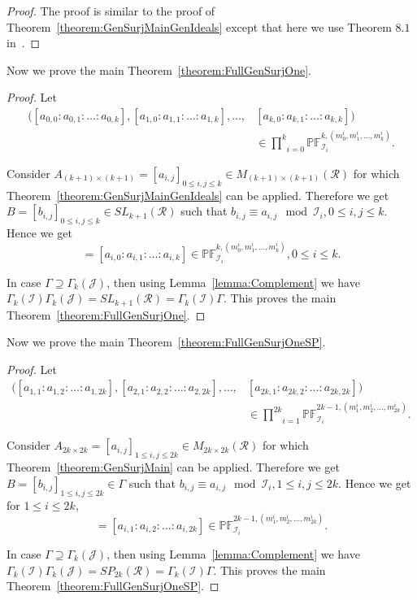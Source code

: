 \documentclass[12pt]{amsart}
\newcommand{\mbb}{\mathbb}
\newcommand{\mcl}{\mathcal}
\newcommand{\us}{\underset}
\newcommand{\os}{\overset}
\newcommand{\I}{\mcl I}
\newcommand{\R}{\mcl R}
\newcommand{\equ}[1]{%
\begin{equation*}
#1
\end{equation*}
}
\newcommand{\equa}[1]{%
\begin{equation*}
\begin{aligned}
#1
\end{aligned}
\end{equation*}
}
\theoremstyle{plain}
\theoremstyle{definition}
\theoremstyle{remark}
\numberwithin{equation}{section}
\begin{document}
\begin{proof}
The proof is similar to the proof of Theorem~\ref{theorem:GenSurjMainGenIdeals} except that here we use Theorem $8.1$ in~\cite{CPAKII}.	
\end{proof}
Now we prove the main Theorem~\ref{theorem:FullGenSurjOne}.
\begin{proof}
Let \equa{\big([a_{0,0}:a_{0,1}:\ldots: a_{0,k}],[a_{1,0}:a_{1,1}:\ldots: a_{1,k}],\ldots,&[a_{k,0}:a_{k,1}:\ldots: a_{k,k}]\big)\\&\in \us{i=0}{\os{k}{\prod}}\mbb{PF}^{k,(m^i_0,m^i_1,\ldots,m^i_k)}_{\I_i}.}
Consider $A_{(k+1)\times (k+1)}=[a_{i,j}]_{0\leq i,j\leq k}\in M_{(k+1)\times (k+1)}(\R)$ for which Theorem~\ref{theorem:GenSurjMainGenIdeals} can be applied. Therefore we get 
$B=[b_{i,j}]_{0\leq i,j\leq k} \in SL_{k+1}(\R)$ such that $b_{i,j}\equiv a_{i,j} \mod \mcl{I}_i,0\leq i,j\leq k$. Hence we get 
\equ{[b_{i,0}:b_{i,1}:\ldots: b_{i,k}]=[a_{i,0}:a_{i,1}:\ldots: a_{i,k}]\in \mbb{PF}^{k,(m^i_0,m^i_1,\ldots,m^i_k)}_{\I_i},0\leq i\leq k.}
In case $\Gamma \supseteq \Gamma_k(\mcl{J})$, then using Lemma~\ref{lemma:Complement} we have $\Gamma_k(\I)\Gamma_k(\mcl{J})=SL_{k+1}(\R)=\Gamma_k(\I)\Gamma$.
This proves the main Theorem~\ref{theorem:FullGenSurjOne}.	
\end{proof}
Now we prove the main Theorem~\ref{theorem:FullGenSurjOneSP}.
\begin{proof}
	Let \equa{\big([a_{1,1}:a_{1,2}:\ldots: a_{1,2k}],[a_{2,1}:a_{2,2}:\ldots: a_{2,2k}],\ldots,&[a_{2k,1}:a_{2k,2}:\ldots: a_{2k,2k}]\big)\\&\in \us{i=1}{\os{2k}{\prod}}\mbb{PF}^{2k-1,(m^i_1,m^i_2,\ldots,m^i_{2k})}_{\I_i}.}
	Consider $A_{2k\times 2k}=[a_{i,j}]_{1\leq i,j\leq 2k}\in M_{2k\times 2k}(\R)$ for which Theorem~\ref{theorem:GenSurjMain} can be applied. Therefore we get 
	$B=[b_{i,j}]_{1\leq i,j\leq 2k} \in \Gamma$ such that $b_{i,j}\equiv a_{i,j} \mod \mcl{I}_i,1\leq i,j\leq 2k$. Hence we get for $1\leq i\leq 2k$,
	\equ{[b_{i,1}:b_{i,2}:\ldots: b_{i,2k}]=[a_{i,1}:a_{i,2}:\ldots: a_{i,2k}]\in \mbb{PF}^{2k-1,(m^i_1,m^i_2,\ldots,m^i_{2k})}_{\I_i}.}
In case $\Gamma \supseteq \Gamma_k(\mcl{J})$, then using Lemma~\ref{lemma:Complement} we have $\Gamma_k(\I)\Gamma_k(\mcl{J})=SP_{2k}(\R)=\Gamma_k(\I)\Gamma$.
	This proves the main Theorem~\ref{theorem:FullGenSurjOneSP}.
\end{proof}

\def\cprime{$'$}
\end{document}
